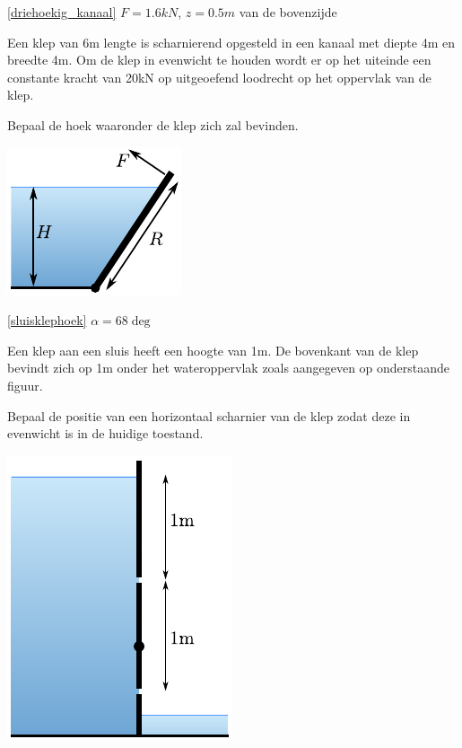 \begin{antwoord}{\ref{driehoekig_kanaal}}
	$F = 1.6\unit{kN}$, $z=0.5\unit{m}$ van de bovenzijde
\end{antwoord}
\begin{toepassing}
	\label{sluisklephoek}
Een klep van 6m lengte is scharnierend opgesteld in een kanaal met diepte 4m en breedte 4m. Om de klep in evenwicht te houden wordt er op het uiteinde een constante kracht van 20kN op uitgeoefend loodrecht op het oppervlak van de klep.
		
Bepaal de hoek waaronder de klep zich zal bevinden.

	\centering
	\includegraphics{fig/hydrostatica/sluisklephoek}
\end{toepassing}
\begin{antwoord}{\ref{sluisklephoek}}
	$\alpha = 68\deg$ 
\end{antwoord}	
\begin{toepassing}[*]
	\label{sluisklep}
Een klep aan een sluis heeft een hoogte van 1m. De bovenkant van de klep bevindt zich op 1m onder het wateroppervlak zoals aangegeven op onderstaande figuur.
		
Bepaal de positie van een horizontaal scharnier van de klep zodat deze in evenwicht is in de huidige toestand.

	\centering
	\includegraphics{fig/hydrostatica/sluisklep}
\end{toepassing}
